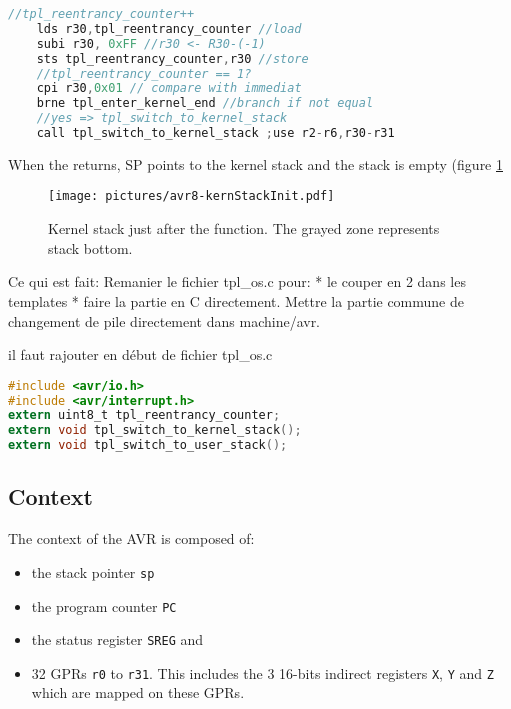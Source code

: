 \begin{lstlisting}[language=C]
	//tpl_reentrancy_counter++
	lds r30,tpl_reentrancy_counter //load
	subi r30, 0xFF //r30 <- R30-(-1)
	sts tpl_reentrancy_counter,r30 //store
	//tpl_reentrancy_counter == 1?
	cpi r30,0x01 // compare with immediat
	brne tpl_enter_kernel_end //branch if not equal
	//yes => tpl_switch_to_kernel_stack
	call tpl_switch_to_kernel_stack ;use r2-r6,r30-r31
\end{lstlisting}

When the  returns, SP points to the kernel stack and the stack is empty (figure \ref{fig:avr8kernStackInit}
\begin{figure}[htbp] %
\begin{minipage}{0.5\textwidth}
    \centering
  \texttt{[image: pictures/avr8-kernStackInit.pdf]} 
\end{minipage}
\begin{minipage}{0.5\textwidth}
   \caption{Kernel stack just after the  function. The grayed zone represents stack bottom.}
   \label{fig:avr8kernStackInit}
\end{minipage}
\end{figure}



Ce qui est fait:
Remanier le fichier tpl_os.c pour:
* le couper en 2 dans les templates
* faire la partie en C directement. Mettre la partie commune de changement de pile directement dans
machine/avr.

il faut rajouter en début de fichier tpl_os.c
\begin{lstlisting}[language=C]
#include <avr/io.h>
#include <avr/interrupt.h>
extern uint8_t tpl_reentrancy_counter;
extern void tpl_switch_to_kernel_stack();
extern void tpl_switch_to_user_stack();
\end{lstlisting}




\subsection{Context}
The context of the AVR is composed of:
\begin{itemize}
\item the stack pointer \texttt{sp}
\item the program counter \texttt{PC}
\item the status register \texttt{SREG} and 
\item 32 GPRs \texttt{r0} to \texttt{r31}. This includes the 3 16-bits indirect registers \texttt{X}, \texttt{Y} and \texttt{Z} which are mapped on these GPRs.
\end{itemize}

